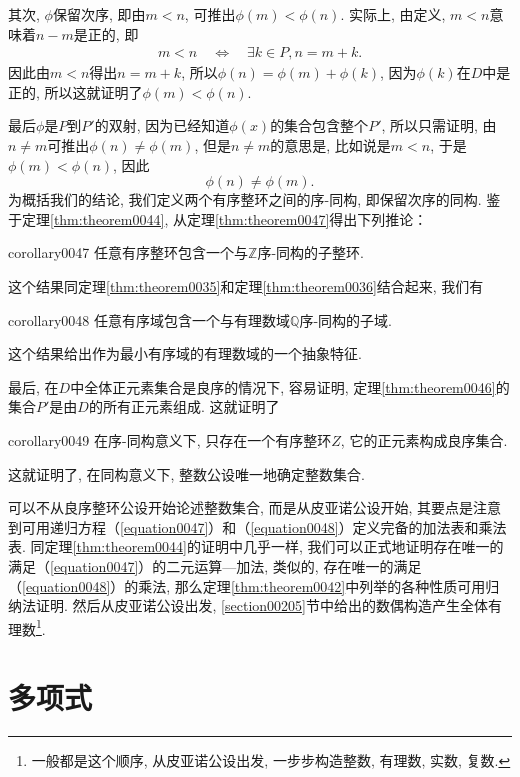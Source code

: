 其次, $\phi$保留次序, 即由$m < n$, 可推出$\phi(m) < \phi(n)$. 实际上, 由定义, $m<n$意味着$n-m$是正的, 即
\begin{gather}\label{equation0049}
m < n \quad \Leftrightarrow\quad \exists k \in P, n=m+k.
\end{gather}
因此由$m<n$得出$n=m+k$, 所以$\phi(n)=\phi(m)+\phi(k)$, 因为$\phi(k)$在$D$中是正的, 所以这就证明了$\phi(m)<\phi(n)$. 

最后$\phi$是$P$到$P'$的双射, 因为已经知道$\phi(x)$的集合包含整个$P'$, 所以只需证明, 由$n \neq m$可推出$\phi(n) \neq \phi(m)$, 但是$n \neq m$的意思是, 比如说是$m < n$, 于是$\phi(m) < \phi(n)$, 因此
\[
\phi(n) \neq \phi(m).
\]
为概括我们的结论, 我们定义两个有序整环之间的序-同构, 即保留次序的同构. 鉴于定理\ref{thm:theorem0044}, 从定理\ref{thm:theorem0047}得出下列推论：
\begin{corollary}{}{corollary0047}
任意有序整环包含一个与$\mathbb{Z}$序-同构的子整环. 
\end{corollary}

这个结果同定理\ref{thm:theorem0035}和定理\ref{thm:theorem0036}结合起来, 我们有
\begin{corollary}{}{corollary0048}
任意有序域包含一个与有理数域$\mathbb{Q}$序-同构的子域. 
\end{corollary}

这个结果给出作为最小有序域的有理数域的一个抽象特征. 

最后, 在$D$中全体正元素集合是良序的情况下, 容易证明, 定理\ref{thm:theorem0046}的集合$P'$是由$D$的所有正元素组成. 这就证明了
\begin{corollary}{}{corollary0049}
在序-同构意义下, 只存在一个有序整环$Z$, 它的正元素构成良序集合. 
\end{corollary}

这就证明了, 在同构意义下, 整数公设唯一地确定整数集合. 

可以不从良序整环公设开始论述整数集合, 而是从皮亚诺公设开始, 其要点是注意到可用递归方程（\ref{equation0047}）和（\ref{equation0048}）定义完备的加法表和乘法表. 同定理\ref{thm:theorem0044}的证明中几乎一样, 我们可以正式地证明存在唯一的满足（\ref{equation0047}）的二元运算---加法, 类似的, 存在唯一的满足（\ref{equation0048}）的乘法, 那么定理\ref{thm:theorem0042}中列举的各种性质可用归纳法证明. 然后从皮亚诺公设出发, \ref{section00205}节中给出的数偶构造产生全体有理数\footnote{一般都是这个顺序, 从皮亚诺公设出发, 一步步构造整数, 有理数, 实数, 复数. }. 



\chapter{多项式}\label{section00103}

